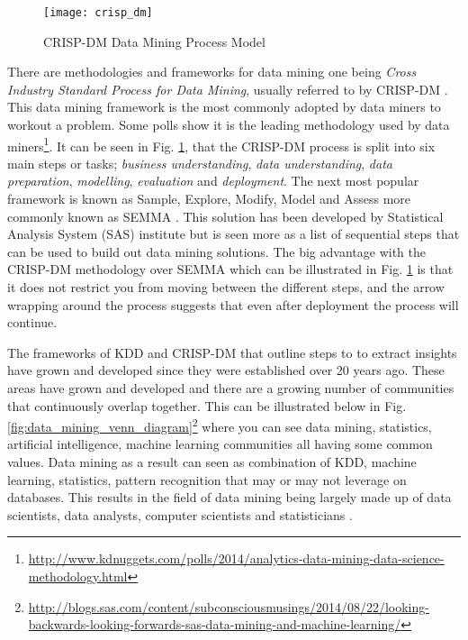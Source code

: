 \begin{figure}[H]
	\texttt{[image: crisp\_dm]}
	\caption{CRISP-DM Data Mining Process Model \\
		\cite[Source:][]{shearer_crisp-dm_2000}		
	}
	\label{fig:crisp_dm}
\end{figure}

There are methodologies and frameworks for data mining one being \textit{Cross Industry Standard Process for Data Mining}, usually referred to by CRISP-DM \citep{shearer_crisp-dm_2000}. This data mining framework is the most commonly adopted by data miners to workout a problem. Some polls show it is the leading methodology used by data miners\footnote{\url{http://www.kdnuggets.com/polls/2014/analytics-data-mining-data-science-methodology.html}}. It can be seen in Fig. \ref{fig:crisp_dm}, that the CRISP-DM process is split into six main steps or tasks; \textit{business understanding}, \textit{data understanding}, \textit{data preparation}, \textit{modelling}, \textit{evaluation} and \textit{deployment}. The next most popular framework is known as Sample, Explore, Modify, Model and Assess more commonly known as SEMMA \citep{azevedo_kdd_2008}. This solution has been developed by Statistical Analysis System (SAS) institute but is seen more as a list of sequential steps that can be used to build out data mining solutions. The big advantage with the CRISP-DM methodology over SEMMA which can be illustrated in Fig. \ref{fig:crisp_dm} is that it does not restrict you from moving between the different steps, and the arrow wrapping around the process suggests that even after deployment the process will continue.  


The frameworks of KDD and CRISP-DM that outline steps to to extract insights have grown and developed since they were established over 20 years ago. These areas have grown and developed and there are a growing number of communities that continuously overlap together. This can be illustrated below in Fig. \ref{fig:data_mining_venn_diagram}\footnote{\url{http://blogs.sas.com/content/subconsciousmusings/2014/08/22/looking-backwards-looking-forwards-sas-data-mining-and-machine-learning/}} where you can see data mining, statistics, artificial intelligence, machine learning communities all having some common values. Data mining as a result can seen as combination of KDD, machine learning, statistics, pattern recognition that may or may not leverage on databases. This results in the field of data mining being largely made up of data scientists, data analysts, computer scientists and statisticians \citep{coenen_data_2011}. 

